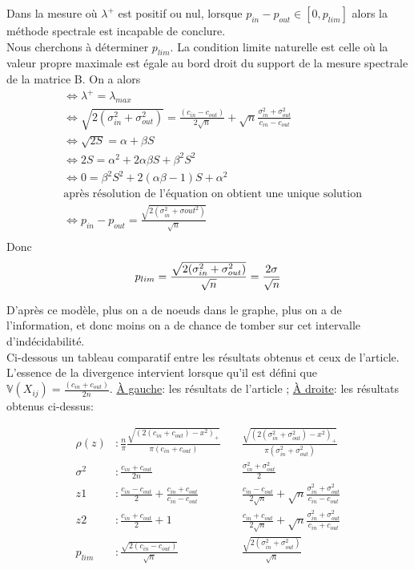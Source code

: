 Dans la mesure où  $\lambda^+$ est positif ou nul, lorsque $p_{in} - p_{out} \in [0, p_{lim}]$ alors la méthode spectrale est incapable de conclure.\\
 
Nous cherchons à déterminer $p_{lim}$.
La condition limite naturelle est celle où la valeur propre maximale est égale au bord droit du support de la mesure spectrale de la matrice B.
On a alors 
\begin{align*}
	&\Leftrightarrow \lambda^+ = \lambda_{max}\\
	&\Leftrightarrow \sqrt{2(\sigma_{in}^2 + \sigma_{out}^2)} = \frac{(c_{in} - c_{out})}{2\sqrt{n}} + \sqrt{n}\frac{\sigma_{in}^2 + \sigma_{out}^2}{c_{in} - c_{out}}\\
	&\Leftrightarrow \sqrt{2S} = \alpha + \beta S\\
	&\Leftrightarrow 2S = \alpha^2 + 2\alpha \beta S +\beta^2 S^2\\
	&\Leftrightarrow 0 = \beta^2 S^2 + 2(\alpha \beta - 1)S+ \alpha^2 \\
	&\text{après résolution de l'équation on obtient une unique solution}\\
	&\Leftrightarrow p_{in} - p_{out} = \frac{\sqrt{2(\sigma_{in}^2 + \sigma{out}^2)}}{\sqrt{n}}  \\
\end{align*}
Donc
\begin{equation}
	p_{lim} = \frac{\sqrt{2(\sigma_{in}^2 + \sigma_{out}^2)}}{\sqrt{n}}= \frac{2\sigma}{\sqrt{n}}  \\
\end{equation}

D'après ce modèle, plus on a de noeuds dans le graphe, plus on a de l'information, et donc moins on a de chance de tomber sur cet intervalle d’indécidabilité.\\

Ci-dessous un tableau comparatif entre les résultats obtenus et ceux de l'article.
L'essence de la divergence intervient lorsque qu'il est défini que $\mathbb{V}(X_{ij}) = \frac{(c_{in} + c_{out})}{2n}$.
\underline{À gauche}: les résultats de l'article ; \underline{À droite}: les résultats obtenus ci-dessus:

\begin{align*}
	\rho (z)&: \frac{n}{\pi}\frac{\sqrt{(2(c_{in} + c_{out}) - x^2)_+}}{\pi(c_{in} + c_{out})} &\;& \frac{\sqrt{(2(\sigma_{in}^2 + \sigma_{out}^2) - x^2)_+}}{\pi(\sigma_{in}^2 + \sigma_{out}^2)}\\
	\sigma^2&: \frac{c_{in} + c_{out}}{2n} &\;& \frac{\sigma_{in}^2 + \sigma_{out}^2}{2} \\
	z1&: \frac{c_{in}-c_{out}}{2} + \frac{c_{in}+c_{out}}{c_{in}-c_{out}} &\;& \frac{c_{in}-c_{out}}{2\sqrt{n}} + \sqrt{n}\frac{\sigma_{in}^2+\sigma_{out}^2}{c_{in}-c_{out}}\\
	z2&: \frac{c_{in}+c_{out}}{2} + 1 &\;& \frac{c_{in}+c_{out}}{2\sqrt{n}} + \sqrt{n}\frac{\sigma_{in}^2+\sigma_{out}^2}{c_{in}+c_{out}}\\
	p_{lim}&: \frac{\sqrt{2(c_{in} - c_{out})}}{\sqrt{n}}&\;& \frac{\sqrt{2(\sigma_{in}^2 + \sigma_{out}^2)}}{\sqrt{n}}\\
\end{align*}


